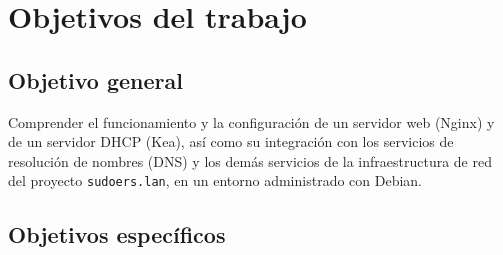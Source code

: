 
\section{Objetivos del trabajo}

\subsection{Objetivo general}

Comprender el funcionamiento y la configuración de un servidor web (Nginx) y
de un servidor DHCP (Kea), así como su integración con los servicios de
resolución de nombres (DNS) y los demás servicios de la infraestructura de
red del proyecto \texttt{sudoers.lan}, en un entorno administrado con Debian.

\subsection{Objetivos específicos}

